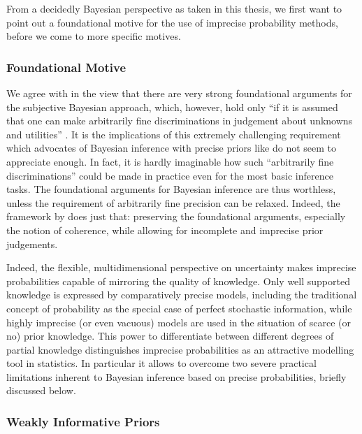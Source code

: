 From a decidedly Bayesian perspective as taken in this thesis,
we first want to point out a foundational motive for the use of imprecise probability methods,
before we come to more specific motives.

\subsubsection{Foundational Motive}
\label{sec:motivation:bayesian-foundational}

We agree with \textcite[\S 1.1]{1994:berger} in the view that there are very strong foundational arguments
for the subjective Bayesian approach, which, however, hold only
``if it is assumed that one can make arbitrarily fine discriminations
in judgement about unknowns and utilities'' \parencite[p.~303]{1994:berger}. 
It is the implications of this extremely challenging requirement
which advocates of Bayesian inference with precise priors
like \textcite{1987:lindley} do not seem to appreciate enough.
In fact, it is hardly imaginable how such ``arbitrarily fine discriminations''
could be made in practice even for the most basic inference tasks.
The foundational arguments for Bayesian inference are thus worthless,
unless the requirement of arbitrarily fine precision can be relaxed.
Indeed, the framework by \textcite{1991:walley} does just that:
preserving the foundational arguments, especially the notion of coherence,
while allowing for incomplete and imprecise prior judgements.

Indeed,
the flexible, multidimensional perspective on uncertainty makes imprecise probabilities capable of mirroring the quality of knowledge.
Only well supported knowledge is expressed by comparatively precise models,
including the traditional concept of probability as the special case of perfect stochastic information,
while highly imprecise (or even vacuous) models are used in the situation of scarce (or no) prior knowledge.
This power to differentiate between different degrees of partial knowledge
distinguishes imprecise probabilities as an attractive modelling tool in statistics.
In particular it allows to overcome two severe practical limitations inherent to Bayesian inference based on precise probabilities,
briefly discussed below.

\subsubsection{Weakly Informative Priors}
\label{sec:motivation:near-ignorance}

